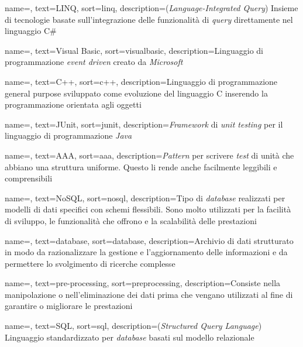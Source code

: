 {
    name=,
    text=LINQ,
    sort=linq,
    description={(\textit{Language-Integrated Query})
    Insieme di tecnologie basate sull'integrazione delle funzionalità di \textit{query} direttamente nel linguaggio C\# \cite{siteE:wiki}}
}

{
    name=,
    text=Visual Basic,
    sort=visualbasic,
    description={Linguaggio di programmazione \textit{event driven} creato da \textit{Microsoft} \cite{siteE:wiki}}
}

{
    name=,
    text=C++,
    sort=c++,
    description={Linguaggio di programmazione
    general purpose sviluppato come evoluzione del linguaggio C inserendo la programmazione orientata agli oggetti}
}

{
    name=,
    text=JUnit,
    sort=junit,
    description={\textit{Framework} di \textit{unit testing} per il linguaggio di programmazione \textit{Java}}
}

{
    name=,
    text=AAA,
    sort=aaa,
    description={\textit{Pattern} per scrivere \textit{test} di unità che abbiano una struttura uniforme. Questo li rende anche facilmente leggibili e comprensibili}
}

{
    name=,
    text=NoSQL,
    sort=nosql,
    description={Tipo di \textit{database} realizzati per modelli di dati specifici con schemi flessibili. Sono molto utilizzati per la facilità di sviluppo, le funzionalità che offrono e la scalabilità delle prestazioni \cite{siteE:wiki}}
}

{
    name=,
    text=database,
    sort=database,
    description={Archivio di dati strutturato in modo da razionalizzare la gestione e l'aggiornamento delle informazioni e da permettere lo svolgimento di ricerche complesse \cite{siteC:def-db}}
}

{
    name=,
    text=pre-processing,
    sort=preprocessing,
    description={Consiste nella manipolazione o nell'eliminazione
    dei dati prima che vengano utilizzati al fine di
    garantire o migliorare le prestazioni \cite{siteE:wiki}}
}

{
    name=,
    text=SQL,
    sort=sql,
    description={(\textit{Structured Query Language}) Linguaggio standardizzato per \textit{database} basati sul modello relazionale}
}

